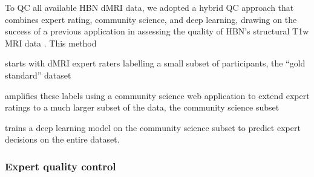 \documentclass[9pt,lineno]{elife}
\begin{document}
To QC all available HBN dMRI data, we adopted a hybrid QC approach that
combines expert rating, community science, and deep learning, drawing on the
success of a previous application in assessing the quality of HBN's structural
T1w MRI data \citep{keshavan2019-er}. This method
\begin{enumerate*}[%
    label=(\roman*),%
    before={{ }},%
    itemjoin={{; }},%
    itemjoin*={{ and }}]
    \item starts with dMRI expert raters labelling a small subset of participants,
    the ``gold standard'' dataset
    \item amplifies these labels using a community science web application to
    extend expert ratings to a much larger subset of the data, the community
    science subset
    \item trains a deep learning model on the community science subset to
    predict expert decisions on the entire dataset.
\end{enumerate*}

\subsubsection{Expert quality control}
\end{document}
